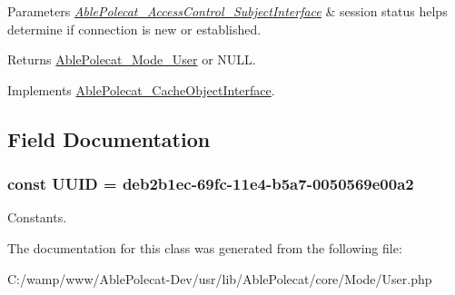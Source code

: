 \begin{DoxyParams}{Parameters}
{\em \hyperlink{interface_able_polecat___access_control___subject_interface}{Able\+Polecat\+\_\+\+Access\+Control\+\_\+\+Subject\+Interface}} & session status helps determine if connection is new or established.\\
\hline
\end{DoxyParams}
\begin{DoxyReturn}{Returns}
\hyperlink{class_able_polecat___mode___user}{Able\+Polecat\+\_\+\+Mode\+\_\+\+User} or N\+U\+L\+L. 
\end{DoxyReturn}


Implements \hyperlink{interface_able_polecat___cache_object_interface_a3f2135f6ad45f51d075657f6d20db2cd}{Able\+Polecat\+\_\+\+Cache\+Object\+Interface}.



\subsection{Field Documentation}
\hypertarget{class_able_polecat___mode___user_a74b892c8c0b86bf9d04c5819898c51e7}{}
\subsubsection[{U\+U\+I\+D}]{\setlength{\rightskip}{0pt plus 5cm}const U\+U\+I\+D = \textquotesingle{}deb2b1ec-\/69fc-\/11e4-\/b5a7-\/0050569e00a2\textquotesingle{}}\label{class_able_polecat___mode___user_a74b892c8c0b86bf9d04c5819898c51e7}
Constants. 

The documentation for this class was generated from the following file\+:\begin{DoxyCompactItemize}
\item 
C\+:/wamp/www/\+Able\+Polecat-\/\+Dev/usr/lib/\+Able\+Polecat/core/\+Mode/User.\+php\end{DoxyCompactItemize}

